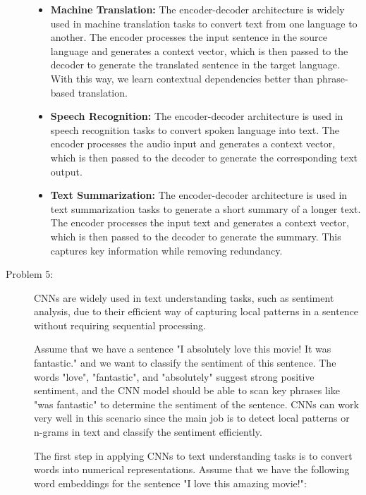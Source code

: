 \documentclass[10pt]{article}
\begin{document}
\begin{description}
\begin{itemize}
    \item \textbf{Machine Translation:} The encoder-decoder architecture is widely used in machine translation tasks to convert text from one language to another.
    The encoder processes the input sentence in the source language and generates a context vector, which is then passed to the decoder to generate the translated sentence in the target language.
    With this way, we learn contextual dependencies better than phrase-based translation.
    \item \textbf{Speech Recognition:} The encoder-decoder architecture is used in speech recognition tasks to convert spoken language into text.
    The encoder processes the audio input and generates a context vector, which is then passed to the decoder to generate the corresponding text output. 
    \item \textbf{Text Summarization:} The encoder-decoder architecture is used in text summarization tasks to generate a short summary of a longer text.
    The encoder processes the input text and generates a context vector, which is then passed to the decoder to generate the summary. This captures key information while removing redundancy.
\end{itemize}

\pagebreak

\item[Problem 5:] \hfill %

CNNs are widely used in text understanding tasks, such as sentiment analysis, due to their efficient way of capturing local patterns in a sentence without 
requiring sequential processing. 

Assume that we have a sentence "I absolutely love this movie! It was fantastic." and we want to classify the sentiment of this sentence.
The words "love", "fantastic", and "absolutely" suggest strong positive sentiment, and the CNN model should be able to scan key phrases like "was fantastic" to
determine the sentiment of the sentence. CNNs can work very well in this scenario since the main job is to detect local patterns or n-grams in text and classify the 
sentiment efficiently.

The first step in applying CNNs to text understanding tasks is to convert words into numerical representations.
Assume that we have the following word embeddings for the sentence "I love this amazing movie!":


\end{description}
\end{document}
